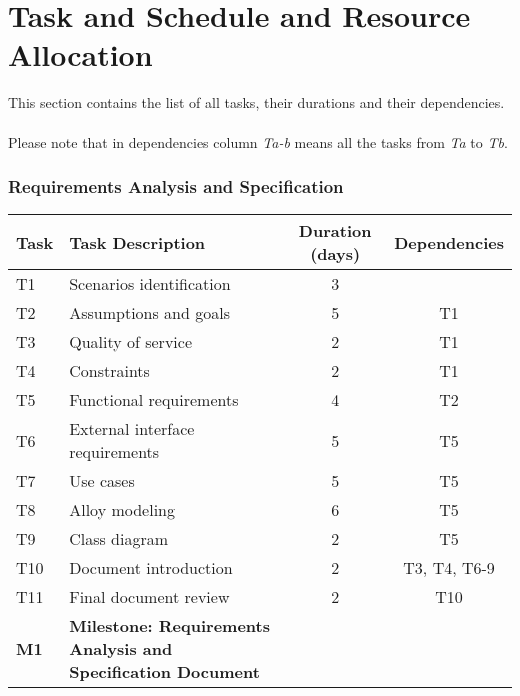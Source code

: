 \section{Task and Schedule and Resource Allocation}
This section contains the list of all tasks, their durations and their dependencies.\\
\\
Please note that in dependencies column \textit{Ta-b} means all the tasks from \textit{Ta} to \textit{Tb}.

\subsubsection{Requirements Analysis and Specification}
\begin{tabular}{| l | p{7cm}  | c |  c |}
\hline
\textbf{Task} & \textbf{Task Description} & \textbf{Duration (days)} & \textbf{Dependencies}\\
\hline
T1 & Scenarios identification & 3 & \\
\hline
T2 & Assumptions and goals & 5 & T1\\
\hline
T3 & Quality of service & 2 & T1\\
\hline
T4 & Constraints & 2 & T1\\
\hline
T5 & Functional requirements & 4 & T2\\
\hline
T6 & External interface requirements & 5 & T5\\
\hline
T7 & Use cases & 5 & T5\\
\hline
T8 & Alloy modeling & 6 & T5\\
\hline
T9 & Class diagram & 2 & T5\\
\hline
T10 & Document introduction & 2 & T3, T4, T6-9\\
\hline
T11 & Final document review & 2 & T10\\
\hline
\textbf{M1} & \textbf{Milestone: Requirements Analysis and Specification Document} &  & \\
\hline
\end{tabular}

